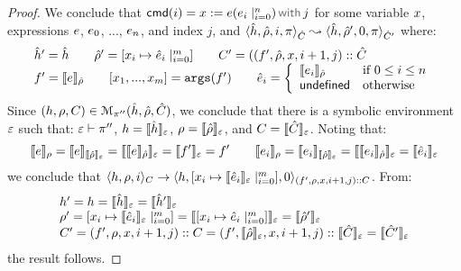 \begin{proof}
\noindent{} 
We conclude that $\ccmd{i} =   \jsilcall{\jvar}{\jsilexpr}{\jsilexpr_i \mid_{i = 0}^{n}}{j}$
for some variable $\jvar$, expressions $\jsilexpr$, $\jsilexpr_0$, ..., $\jsilexpr_n$, and 
index $j$, and $\symbtrans{\sheap, \sstore, i, \pc}{\sheap, \sstore', 0, \pc}[\sctx][\sctx']$
where: 
$$
\begin{array}{l}
\sheap' = \sheap
%
\qquad
% 
\sstore' = [ \jvar_i \mapsto \sexpr_i \mid_{i = 0}^{m}] 
%
\qquad 
%
\ctx' = ((\pid', \sstore, \jvar, i+1, j)::\sctx
\\
%
\pid' = \symbeval{\jsilexpr}{\sstore}
%
\qquad 
%
\jsillist{\jvar_1, ..., \jvar_{m}} = \args(\pid')
%
\qquad
%
\sexpr_i = \left\lbrace{\begin{array}{ll}
\symbeval{\jsilexpr_i}{\sstore} & \text{if } 0 \leq i \leq n \\
\jsundefined                            & \text{otherwise}
\end{array}}\right.
\end{array}
$$
Since $(\heap, \store, \ctx) \in \smodels{\sheap, \sstore, \sctx}{\pc''}$, we conclude that 
there is a symbolic environment $\senv$ such that: $\senv \vdash \pc''$, 
$\heap = \semexpr{\sheap}{\senv}$, $\store = \semexpr{\sstore}{\senv}$, 
and $\ctx = \semexpr{\sctx}{\senv}$.
Noting that: 
$$
\semexpr{\jsilexpr}{\store} = \semexpr{\jsilexpr}{\semexpr{\sstore}{\senv}} 
    = \semexpr{\semexpr{\jsilexpr}{\sstore}}{\senv} 
    = \semexpr{\pid'}{\senv}
    = \pid'   
 \qquad
\semexpr{\jsilexpr_i}{\store} = \semexpr{\jsilexpr_i}{\semexpr{\sstore}{\senv}}
    = \semexpr{\semexpr{\jsilexpr_i}{\sstore}}{\senv}
    = \semexpr{\sexpr_i}{\senv}
$$
we conclude that 
$\semtrans{\heap, \store, i}{\heap, [ \jvar_i \mapsto \semexpr{\sexpr_i}{\senv} \mid_{i = 0}^{m}] , 0}[\ctx][(\pid', \store, \jvar, i+1, j) :: \ctx]$. 
From: 
$$
\begin{array}{l}
\heap' = \heap = \semexpr{\sheap}{\senv} = \semexpr{\sheap'}{\senv} \\
%
\store' =  [ \jvar_i \mapsto \semexpr{\sexpr_i}{\senv} \mid_{i = 0}^{m}] = \semexpr{[ \jvar_i \mapsto \sexpr_i \mid_{i = 0}^{m}]}{\senv} = \semexpr{\sstore'}{\senv} \\
%
\ctx' = (\pid', \store, \jvar, i+1, j) :: \ctx = (\pid', \semexpr{\sstore}{\senv}, \jvar, i+1, j) :: \semexpr{\sctx}{\senv} = \semexpr{\sctx'}{\senv} 
\end{array}
$$
the result follows. 
\vspace{6pt}



\end{proof}
